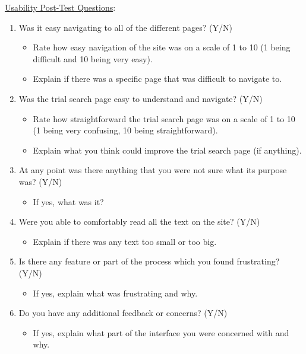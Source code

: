 \documentclass[12pt, titlepage]{article}
\begin{document}
\noindent \underline{Usability Post-Test Questions}:
\begin{enumerate}
  \item Was it easy navigating to all of the different pages? (Y/N)
    \begin{itemize}
      \item Rate how easy navigation of the site was on a scale of 1 to 10 (1 being difficult and 10 being very easy).
      \item Explain if there was a specific page that was difficult to navigate to.
    \end{itemize}
	\item Was the trial search page easy to understand and navigate? (Y/N)
    \begin{itemize}
      \item Rate how straightforward the trial search page was on a scale of 1 to 10 (1 being very confusing, 10 being straightforward).
      \item Explain what you think could improve the trial search page (if anything).
    \end{itemize}
  \item At any point was there anything that you were not sure what its purpose was? (Y/N)
    \begin{itemize}
      \item If yes, what was it?
    \end{itemize}
  \item Were you able to comfortably read all the text on the site? (Y/N)
    \begin{itemize}
      \item Explain if there was any text too small or too big.
    \end{itemize}
  \item  Is there any feature or part of the process which you found frustrating? (Y/N)
    \begin{itemize}
      \item If yes, explain what was frustrating and why.
    \end{itemize}
  \item Do you have any additional feedback or concerns? (Y/N)
    \begin{itemize}
      \item If yes, explain what part of the interface you were concerned with and why.
    \end{itemize}
\end{enumerate}
\end{document}
